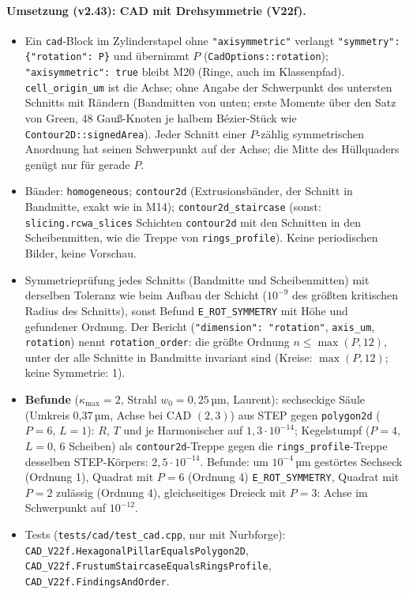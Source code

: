 \paragraph{Umsetzung (v2.43): CAD mit Drehsymmetrie (V22f).}
\begin{itemize}[nosep]
  \item Ein \verb|cad|-Block im Zylinderstapel ohne \verb|"axisymmetric"| verlangt \verb|"symmetry": {"rotation": P}|
        und übernimmt $P$ (\verb|CadOptions::rotation|); \verb|"axisymmetric": true| bleibt M20 (Ringe, auch im
        Klassenpfad). \verb|cell_origin_um| ist die Achse; ohne Angabe der Schwerpunkt des untersten Schnitts mit
        Rändern (Bandmitten von unten; erste Momente über den Satz von Green, 48 Gauß-Knoten je halbem Bézier-Stück wie
        \verb|Contour2D::signedArea|). Jeder Schnitt einer $P$-zählig symmetrischen Anordnung hat seinen Schwerpunkt auf
        der Achse; die Mitte des Hüllquaders genügt nur für gerade $P$.
  \item Bänder: \verb|homogeneous|; \verb|contour2d| (Extrusionsbänder, der Schnitt in Bandmitte, exakt wie in M14);
        \verb|contour2d_staircase| (sonst: \verb|slicing.rcwa_slices| Schichten \verb|contour2d| mit den Schnitten in den
        Scheibenmitten, wie die Treppe von \verb|rings_profile|). Keine periodischen Bilder, keine Vorschau.
  \item Symmetrieprüfung jedes Schnitts (Bandmitte und Scheibenmitten) mit derselben Toleranz wie beim Aufbau der
        Schicht ($10^{-9}$ des größten kritischen Radius des Schnitts), sonst Befund \verb|E_ROT_SYMMETRY| mit Höhe und
        gefundener Ordnung. Der Bericht (\verb|"dimension": "rotation"|, \verb|axis_um|, \verb|rotation|) nennt
        \verb|rotation_order|: die größte Ordnung $n\le\max(P,12)$, unter der alle Schnitte in Bandmitte invariant sind
        (Kreise: $\max(P,12)$; keine Symmetrie: 1).
  \item \textbf{Befunde} ($\kappa_{\max}=2$, Strahl $w_0=0{,}25$\,µm, Laurent): sechseckige Säule (Umkreis 0,37\,µm,
        Achse bei CAD $(2,3)$) aus STEP gegen \verb|polygon2d| ($P=6$, $L=1$): $R$, $T$ und je Harmonischer auf
        $1{,}3\cdot10^{-14}$; Kegelstumpf ($P=4$, $L=0$, 6 Scheiben) als \verb|contour2d|-Treppe gegen die
        \verb|rings_profile|-Treppe desselben STEP-Körpers: $2{,}5\cdot10^{-14}$. Befunde: um $10^{-4}$\,µm gestörtes
        Sechseck (Ordnung 1), Quadrat mit $P=6$ (Ordnung 4) \verb|E_ROT_SYMMETRY|, Quadrat mit $P=2$ zulässig
        (Ordnung 4), gleichseitiges Dreieck mit $P=3$: Achse im Schwerpunkt auf $10^{-12}$.
  \item Tests (\verb|tests/cad/test_cad.cpp|, nur mit Nurbforge): \verb|CAD_V22f.HexagonalPillarEqualsPolygon2D|,
        \verb|CAD_V22f.FrustumStaircaseEqualsRingsProfile|, \verb|CAD_V22f.FindingsAndOrder|.
\end{itemize}

